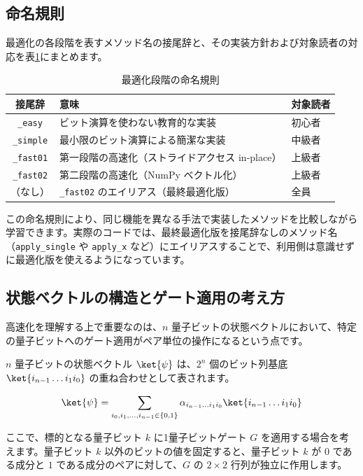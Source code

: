 \subsection{命名規則}

最適化の各段階を表すメソッド名の接尾辞と、その実装方針および対象読者の対応を表\ref{tab:naming_convention}にまとめます。

\begin{table}[htbp]
\centering
\begin{tabular}{cll}
\hline
\textbf{接尾辞} & \textbf{意味} & \textbf{対象読者} \\ \hline
\texttt{\_easy} & ビット演算を使わない教育的な実装 & 初心者 \\
\texttt{\_simple} & 最小限のビット演算による簡潔な実装 & 中級者 \\
\texttt{\_fast01} & 第一段階の高速化（ストライドアクセス in-place） & 上級者 \\
\texttt{\_fast02} & 第二段階の高速化（NumPy ベクトル化） & 上級者 \\
（なし） & \texttt{\_fast02} のエイリアス（最終最適化版） & 全員 \\ \hline
\end{tabular}
\caption{最適化段階の命名規則}
\label{tab:naming_convention}
\end{table}

この命名規則により、同じ機能を異なる手法で実装したメソッドを比較しながら学習できます。実際のコードでは、最終最適化版を接尾辞なしのメソッド名（\texttt{apply\_single} や \texttt{apply\_x} など）にエイリアスすることで、利用側は意識せずに最適化版を使えるようになっています。

\subsection{状態ベクトルの構造とゲート適用の考え方}

高速化を理解する上で重要なのは、$n$ 量子ビットの状態ベクトルにおいて、特定の量子ビットへのゲート適用がペア単位の操作になるという点です。

$n$ 量子ビットの状態ベクトル $\ket{\psi}$ は、$2^n$ 個のビット列基底 $\ket{i_{n-1} \dots i_1 i_0}$ の重ね合わせとして表されます。

\begin{equation}
\ket{\psi} = \sum_{i_0, i_1, \dots, i_{n-1} \in \{0,1\}}
\alpha_{i_{n-1} \dots i_1 i_0} \ket{i_{n-1} \dots i_1 i_0}
\end{equation}

ここで、標的となる量子ビット $k$ に1量子ビットゲート $G$ を適用する場合を考えます。量子ビット $k$ 以外のビットの値を固定すると、量子ビット $k$ が $0$ である成分と $1$ である成分のペアに対して、$G$ の $2 \times 2$ 行列が独立に作用します。

